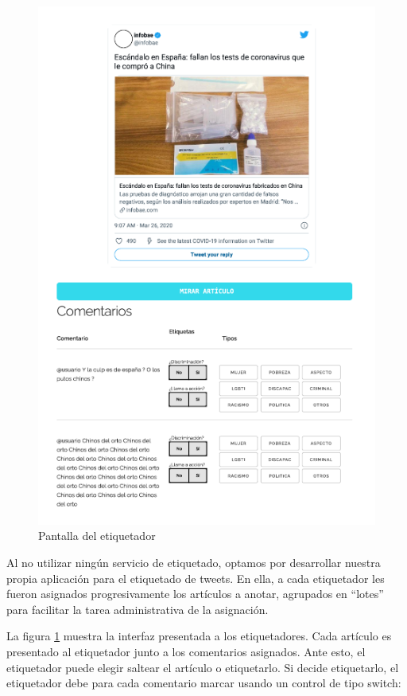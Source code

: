 \begin{figure}
    \centering
    \includegraphics[width=\textwidth]{img/labeler.pdf}
    \caption{Pantalla del etiquetador}
    \label{fig:labeler_example}
\end{figure}

Al no utilizar ningún servicio de etiquetado, optamos por desarrollar nuestra propia aplicación para el etiquetado de tweets. En ella, a cada etiquetador les fueron asignados progresivamente los artículos a anotar, agrupados en ``lotes'' para facilitar la tarea administrativa de la asignación.

La figura \ref{fig:labeler_example} muestra la interfaz presentada a los etiquetadores. Cada artículo es presentado al etiquetador junto a los comentarios asignados. Ante esto, el etiquetador puede elegir saltear el artículo o etiquetarlo. Si decide etiquetarlo, el etiquetador debe para cada comentario marcar usando un control de tipo switch:


